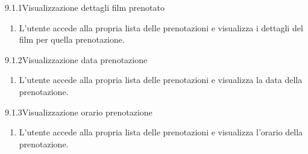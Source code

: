 \newpage

\begin{usecase}{9.1.1}{Visualizzazione dettagli film prenotato}\label{uc:lista-prenotazioni-singola-dettagli-film}
  \usecasemain{}

  \begin{enumerate}
    \item L'utente accede alla propria lista delle prenotazioni e visualizza i dettagli del film per quella prenotazione.
  \end{enumerate}
\end{usecase}

\begin{usecase}{9.1.2}{Visualizzazione data prenotazione}\label{uc:lista-prenotazioni-singola-data}
  \usecasemain{}

  \begin{enumerate}
    \item L'utente accede alla propria lista delle prenotazioni e visualizza la data della prenotazione.
  \end{enumerate}
\end{usecase}

\begin{usecase}{9.1.3}{Visualizzazione orario prenotazione}\label{uc:lista-prenotazioni-singola-orario}
  \usecasemain{}

  \begin{enumerate}
    \item L'utente accede alla propria lista delle prenotazioni e visualizza l'orario della prenotazione.
  \end{enumerate}
\end{usecase}

